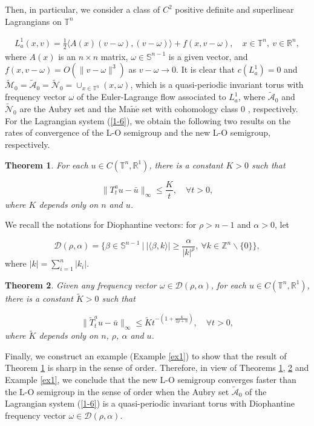 \documentclass{amsart}[12pt]
\newtheorem{theorem}{Theorem}[section]
\theoremstyle{definition}
\theoremstyle{remark}
\numberwithin{equation}{section}
\begin{document}
Then, in particular, we consider a class of $C^2$ positive
definite and superlinear Lagrangians on $\mathbb{T}^n$

\begin{align}\label{1-6}
L^1_a(x,v)=\frac{1}{2}\langle
A(x)(v-\omega),(v-\omega)\rangle+f(x,v-\omega), \quad x\in
\mathbb{T}^n,\ v\in\mathbb{R}^n,
\end{align}
where $A(x)$ is an $n\times n$ matrix, $\omega\in\mathbb{S}^{n-1}$
is a given vector, and $f(x,v-\omega)=O(\|v-\omega\|^3)$ as
$v-\omega\rightarrow 0$. It is clear that $c(L^1_a)=0$ and
$\tilde{\mathcal{M}}_0=\tilde{\mathcal{A}}_0=\tilde{\mathcal{N}}_0=\cup_{x\in\mathbb{T}^n}(x,\omega)$,
which is a quasi-periodic invariant torus with frequency vector
$\omega$ of the Euler-Lagrange flow associated to $L^1_a$, where
$\tilde{\mathcal{A}}_0$ and $\tilde{\mathcal{N}}_0$ are the Aubry
set and the Ma$\mathrm{\tilde{n}}\mathrm{\acute{e}}$ set with
cohomology class 0 \cite{Mat93}, respectively. For the Lagrangian
system (\ref{1-6}), we obtain the following two results on the
rates of convergence of the L-O semigroup and the new L-O
semigroup, respectively.

\begin{theorem}\label{th2}
For each $u\in C(\mathbb{T}^n,\mathbb{R}^1)$, there is a constant
$K>0$ such that

\[
\|T^a_tu-\bar{u}\|_\infty\leq\frac{K}{t}, \quad \forall t>0,
\]
where $K$ depends only on $n$ and $u$.
\end{theorem}

We recall the notations for Diophantine vectors: for $\rho>n-1$
and $\alpha>0$, let

\[
\mathcal{D}(\rho,\alpha)=\Big\{\beta\in \mathbb{S}^{n-1}\ |\
|\langle\beta,k\rangle|\geq\frac{\alpha}{|k|^\rho},\ \forall
k\in\mathbb{Z}^n\backslash\{0\}\Big\},
\]
where $|k|=\sum_{i=1}^n|k_i|$.

\begin{theorem}\label{th3}
Given any frequency vector $\omega\in\mathcal{D}(\rho,\alpha)$,
for each $u\in C(\mathbb{T}^n,\mathbb{R}^1)$, there is a constant
$\tilde{K}>0$ such that

\[
\|\tilde{T}^a_tu-\bar{u}\|_\infty\leq
\tilde{K}t^{-(1+\frac{4}{2\rho+n})}, \quad \forall t>0,
\]
where $\tilde{K}$ depends only on $n$, $\rho$, $\alpha$ and $u$.
\end{theorem}

Finally, we construct an example (Example \ref{ex1}) to show that
the result of Theorem \ref{th2} is sharp in the sense of order.
Therefore, in view of Theorems \ref{th2}, \ref{th3} and Example
\ref{ex1}, we conclude that the new L-O semigroup converges faster
than the L-O semigroup in the sense of order when the Aubry set
$\tilde{\mathcal{A}}_0$ of the Lagrangian system (\ref{1-6}) is a
quasi-periodic invariant torus with Diophantine frequency vector
$\omega\in\mathcal{D}(\rho,\alpha)$.
\end{document}
